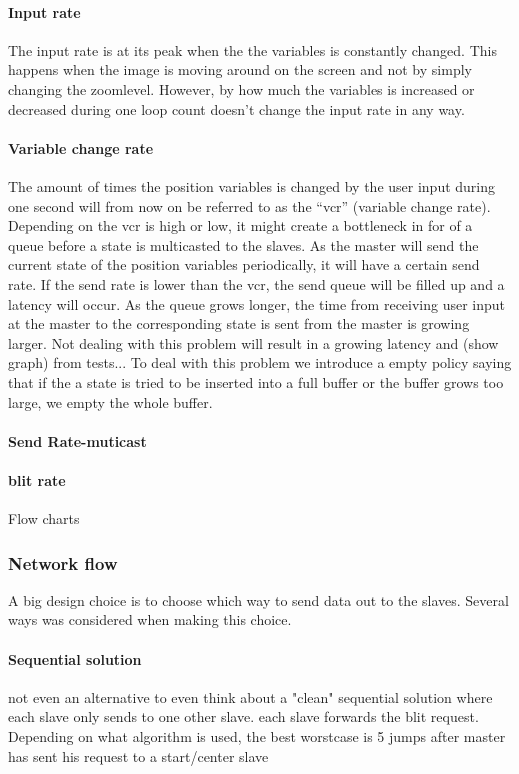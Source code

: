 \documentclass[12pt, a4paper, oneside]{article}
\begin{document}
\paragraph{Input rate}
The input rate is at its peak when the the variables is constantly changed. This happens when the image is moving around on the screen and not by simply changing the zoomlevel. However, by how much the variables is increased or decreased during one loop count doesn't change the input rate in any way. 
\paragraph{Variable change rate}
The amount of times the position variables is changed by the user input during one second will from now on be referred to as the “vcr” (variable change rate).
Depending on the vcr is high or low, it might create a bottleneck in for of a queue before a state is multicasted to the slaves. As the master will send the current state of the position variables periodically, it will have a certain send rate. If the send rate is lower than the vcr, the send queue will be filled up and a latency will occur. As the queue grows longer, the time from receiving user input at the master to the corresponding state is sent from the master is growing larger. 
Not dealing with this problem will result in a growing latency and (show graph) from tests... 
To deal with this problem we introduce a empty policy saying that if the a state is tried to be inserted into a full buffer or the buffer grows too large, we empty the whole buffer.
\paragraph{Send Rate-muticast}

\paragraph{blit rate}
Flow charts

\subsubsection{Network flow}
A big design choice is to choose which way to send data out to the slaves. Several ways was considered when making this choice. 

\paragraph{Sequential solution}
not even an alternative to even think about a "clean" sequential solution where each slave only sends to one other slave.
each slave forwards the blit request. Depending on what algorithm is used, the best worstcase is 5 jumps after master has sent his request to a start/center slave 
\end{document}
